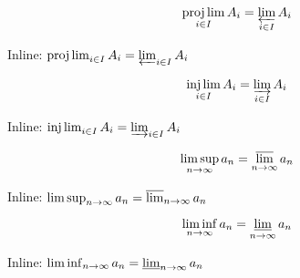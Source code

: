 \documentclass[12pt]{article}
\begin{document}
$$
  \projlim_{i \in I} A_i = \varprojlim_{i \in I} A_i
$$

Inline: $\projlim_{i \in I} A_i = \varprojlim_{i \in I} A_i$


$$
  \injlim_{i \in I} A_i = \varinjlim_{i \in I} A_i
$$

Inline: $\injlim_{i \in I} A_i = \varinjlim_{i \in I} A_i$

$$
  \limsup_{n \to \infty} a_n = \varlimsup_{n \to \infty} a_n
$$

Inline: $\limsup_{n \to \infty} a_n = \varlimsup_{n \to \infty} a_n$

$$
  \liminf_{n \to \infty} a_n = \varliminf_{n \to \infty} a_n
$$

Inline: $\liminf_{n \to \infty} a_n = \varliminf_{n \to \infty} a_n$
\end{document}
